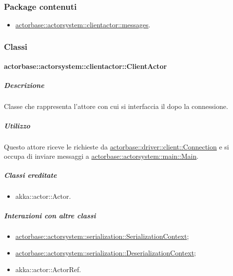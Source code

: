 \documentclass{scalatekids-article}
\begin{document}
\subsubsection{Package contenuti}

\begin{itemize}
\item \hyperref[sec:actorbase::actorsystem::clientactor::messages]{actorbase::actorsystem::clientactor::messages}.
\end{itemize}

\subsubsection{Classi}

\paragraph{actorbase::actorsystem::clientactor::ClientActor}
\label{sec:actorbase::actorsystem::clientactor::ClientActor}

\subparagraph{Descrizione}

Classe che rappresenta l'attore con cui si interfaccia il  dopo
la connessione.

\subparagraph{Utilizzo}

Questo attore riceve le richieste da \hyperref[sec:actorbase::driver::client::Connection]{actorbase::driver::client::Connection}
e si occupa di inviare messaggi a \hyperref[sec:actorbase::actorsystem::main::Main]{actorbase::actorsystem::main::Main}.

\subparagraph{Classi ereditate}

\begin{itemize}

\item akka::actor::Actor.

\end{itemize}

\subparagraph{Interazioni con altre classi}

\begin{itemize}
\item \hyperref[sec:actorbase::actorsystem::serialization::SerializationContext]{actorbase::actorsystem::serialization::SerializationContext};
\item \hyperref[sec:actorbase::actorsystem::serialization::DeserializationContext]{actorbase::actorsystem::serialization::DeserializationContext};
\item akka::actor::ActorRef.
\end{itemize}
\end{document}
